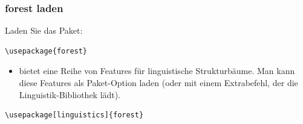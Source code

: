 \begin{frame}[fragile]
\frametitle{forest laden}

Laden Sie das Paket:

\begin{lstlisting}
\usepackage{forest}
\end{lstlisting}

\begin{itemize}
	\item {} bietet eine Reihe von Features für linguistische Strukturbäume. Man kann diese Features als Paket-Option laden (oder mit einem Extrabefehl, der die Linguistik-Bibliothek lädt).
\end{itemize}	

\begin{lstlisting}
\usepackage[linguistics]{forest}
\end{lstlisting}

\end{frame}


